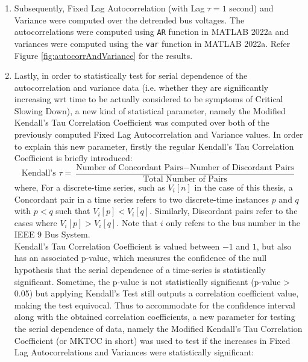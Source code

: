 \begin{enumerate}
\begin{enumerate}
			\item Subsequently, Fixed Lag Autocorrelation (with Lag $\tau = 1$ second) and Variance were computed over the detrended bus voltages. The autocorrelations were computed using \texttt{AR} function in MATLAB 2022a and variances were computed using the \texttt{var} function in MATLAB 2022a. Refer Figure \ref{fig:autocorrAndVariance} for the results.
			
			\item Lastly, in order to statistically test for serial dependence of the autocorrelation and variance data (i.e. whether they are significantly increasing wrt time to be actually considered to be symptoms of Critical Slowing Down), a new kind of statistical parameter, namely the Modified Kendall's Tau Correlation Coefficient was computed over both of the previously computed Fixed Lag Autocorrelation and Variance values. In order to explain this new parameter, firstly the regular Kendall's Tau Correlation Coefficient is briefly introduced:
			\begin{equation}
				\label{eq:kenallsGeneral}
				\text{Kendall's } \tau = \frac{\text{Number of Concordant Pairs} - \text{Number of Discordant Pairs}}{\text{Total Number of Pairs}}
			\end{equation}
			\hspace{25pt} where, For a discrete-time series, such as $V_i[n]$ in the case of this thesis, a Concordant pair in a time series refers to two discrete-time instances $p$ and $q$ with $p<q$ such that $V_i[p] < V_i[q]$. Similarly, Discordant pairs refer to the cases where $V_i[p] > V_i[q]$. Note that $i$ only refers to the bus number in the IEEE 9 Bus System. \\
			Kendall's Tau Correlation Coefficient is valued between $-1$ and $1$, but also has an associated p-value, which measures the confidence of the null hypothesis that the serial dependence of a time-series is statistically significant. Sometime, the p-value is not statistically significant (p-value > 0.05) but applying Kendall's Test still outputs a correlation coefficient value, making the test equivocal. Thus to accommodate for the confidence interval along with the obtained correlation coefficients, a new parameter for testing the serial dependence of data, namely the Modified Kendall's Tau Correlation Coefficient (or MKTCC in short) was used to test if the increases in Fixed Lag Autocorrelations and Variances were statistically significant:
			\begin{equation}
				\label{eq:mktccAutocorrAndVariance}

\end{equation}
\end{enumerate}
\end{enumerate}
